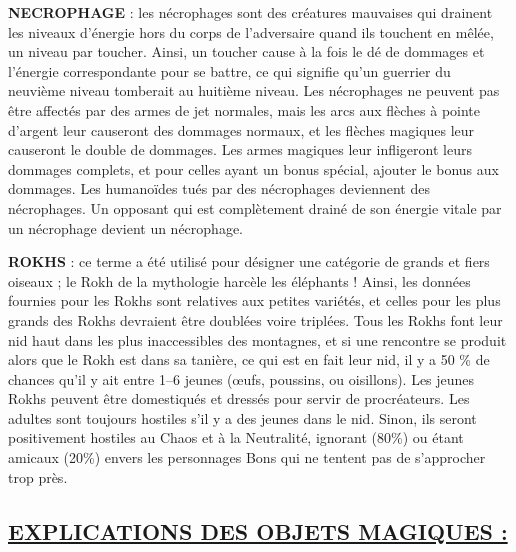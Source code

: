 \label{monstre-necrophage}\textbf{NECROPHAGE} : les nécrophages sont des créatures mauvaises qui drainent les niveaux d'énergie hors du corps de l'adversaire quand ils touchent en mêlée, un niveau par toucher. Ainsi, un toucher cause à la fois le dé de dommages et l'énergie correspondante pour se battre, ce qui signifie qu'un guerrier du neuvième niveau tomberait au huitième niveau. Les nécrophages ne peuvent pas être affectés par des armes de jet normales, mais les arcs aux flèches à pointe d'argent leur causeront des dommages normaux, et les flèches magiques leur causeront le double de dommages. Les armes magiques leur infligeront leurs dommages complets, et pour celles ayant un bonus spécial, ajouter le bonus aux dommages. Les humanoïdes tués par des nécrophages deviennent des nécrophages. Un opposant qui est complètement drainé de son énergie vitale par un nécrophage devient un nécrophage.

\bigskip

\label{monstre-rokh}\textbf{ROKHS} : ce terme a été utilisé pour désigner une catégorie de grands et fiers oiseaux ; le Rokh de la mythologie harcèle les éléphants ! Ainsi, les données fournies pour les Rokhs sont relatives aux petites variétés, et celles pour les plus grands des Rokhs devraient être doublées voire triplées. Tous les Rokhs font leur nid haut dans les plus inaccessibles des montagnes, et si une rencontre se produit alors que le Rokh est dans sa tanière, ce qui est en fait leur nid, il y a 50 \% de chances qu'il y ait entre 1--6 jeunes (œufs, poussins, ou oisillons). Les jeunes Rokhs peuvent être domestiqués et dressés pour servir de procréateurs. Les adultes sont toujours hostiles s'il y a des jeunes dans le nid. Sinon, ils seront positivement hostiles au Chaos et à la Neutralité, ignorant (80\%) ou étant amicaux (20\%) envers les personnages Bons qui ne tentent pas de s'approcher trop près.

\subsection*{\uline{EXPLICATIONS DES OBJETS MAGIQUES :}}

